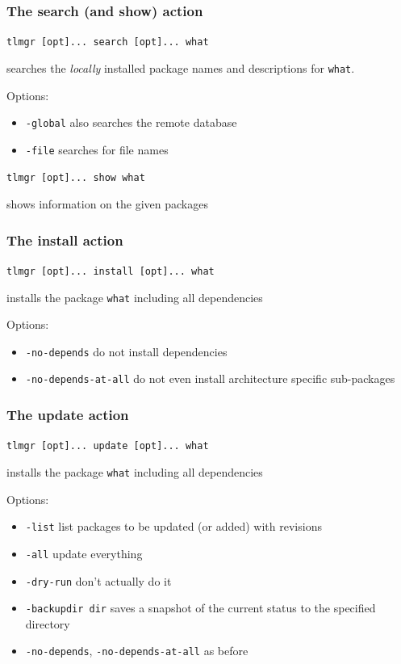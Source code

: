 \documentclass{beamer}
\def\cred#1{{\color{red}#1}}
\begin{document}
\begin{frame}
  \frametitle{The search (and show) action}
  \begin{center}
    \texttt{tlmgr [opt]... search \cred{[opt]... what}}
  \end{center} 
  searches the \emph{locally} installed package names and descriptions
  for \texttt{\cred{what}}.

  Options:
  \begin{itemize}
  \item \texttt{-global} also searches the remote database
  \item \texttt{-file} searches for file names
  \end{itemize}
  \pause
  \begin{center}
    \texttt{tlmgr [opt]... show \cred{what}}
  \end{center} 
  shows information on the given packages
\end{frame}

\begin{frame}
  \frametitle{The install action}
  \begin{center}
    \texttt{tlmgr [opt]... install \cred{[opt]... what}}
  \end{center} 
  installs the package \texttt{what} including all dependencies

  Options:
  \begin{itemize}
  \item \texttt{-no-depends} do not install dependencies
  \item \texttt{-no-depends-at-all} do not even install architecture
    specific sub-packages
  \end{itemize}
\end{frame}

\begin{frame}
  \frametitle{The update action}
  \begin{center}
    \texttt{tlmgr [opt]... update \cred{[opt]... what}}
  \end{center} 
  installs the package \texttt{what} including all dependencies

  Options:
  \begin{itemize}
  \item \texttt{-list} list packages to be updated (or added) with
    revisions 
  \item \texttt{-all} update everything
  \item \texttt{-dry-run} don't actually do it
  \item \texttt{-backupdir dir} saves a snapshot of the current status to
    the specified directory
  \item \texttt{-no-depends}, \texttt{-no-depends-at-all} as before
  \end{itemize}
\end{frame}
\end{document}
